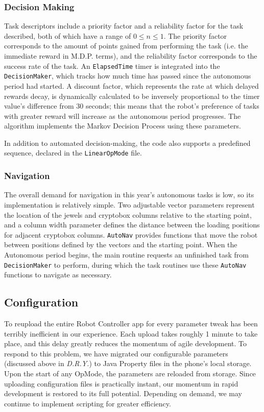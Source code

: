 \documentclass[letterpaper]{article}
\begin{document}
\subsubsection{Decision Making}
Task descriptors include a priority factor and a reliability factor for the task described, both of which have a range of $0 \leq n \leq 1$. The priority factor corresponds to the amount of points gained from performing the task (i.e. the immediate reward in M.D.P. terms), and the reliability factor corresponds to the success rate of the task. An \texttt{ElapsedTime} timer is integrated into the \texttt{DecisionMaker}, which tracks how much time has passed since the autonomous period had started. A discount factor, which represents the rate at which delayed rewards decay, is dynamically calculated to be inversely proportional to the timer value's difference from 30 seconds; this means that the robot's preference of tasks with greater reward will increase as the autonomous period progresses. The algorithm implements the Markov Decision Process using these parameters.

In addition to automated decision-making, the code also supports a predefined sequence, declared in the \texttt{LinearOpMode} file.

\subsubsection{Navigation}
The overall demand for navigation in this year's autonomous tasks is low, so its implementation is relatively simple. Two adjustable vector parameters represent the location of the jewels and cryptobox columns relative to the starting point, and a column width parameter defines the distance between the loading positions for adjacent cryptobox columns. \texttt{AutoNav} provides functions that move the robot between positions defined by the vectors and the starting point. When the Autonomous period begins, the main routine requests an unfinished task from \texttt{DecisionMaker} to perform, during which the task routines use these \texttt{AutoNav} functions to navigate as necessary.

\subsection{Configuration}
To reupload the entire Robot Controller app for every parameter tweak has been terribly inefficient in our experience. Each upload takes roughly 1 minute to take place, and this delay greatly reduces the momentum of agile development. To respond to this problem, we have migrated our configurable parameters (discussed above in \textit{D.R.Y.}) to Java Property files in the phone's local storage. Upon the start of any OpMode, the parameters are reloaded from storage. Since uploading configuration files is practically instant, our momentum in rapid development is restored to its full potential. Depending on demand, we may continue to implement scripting for greater efficiency.
\end{document}
